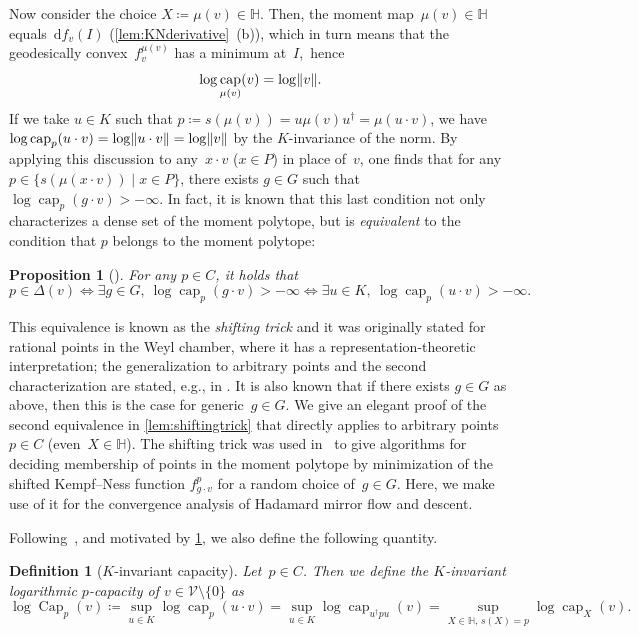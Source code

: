 \documentclass[11pt,letterpaper]{article}
\newtheorem{definition}[theorem]{Definition}\AddToHook{env/definition/begin}{\crefalias{theorem}{definition}}
\newtheorem{proposition}[theorem]{Proposition}\AddToHook{env/proposition/begin}{\crefalias{theorem}{proposition}}\crefname{proposition}{Proposition}{Propositions}
\numberwithin{equation}{section}
\newcommand{\bbH}{\mathbb{H}}
\newcommand{\diff}{\mathrm{d}}
\newcommand{\VV}{\mathcal{V}}
\DeclareMathOperator{\capacity}{cap}
\DeclareMathOperator{\Capacity}{Cap}
\DeclarePairedDelimiter\norm{\lVert}{\rVert}
\begin{document}
Now consider the choice $X \coloneqq \mu(v) \in \bbH$.
Then, the moment map~$\mu(v) \in \bbH$ equals~$\diff f_v(I)$ (\cref{lem:KNderivative}~(b)), which in turn means that the geodesically convex~$f_v^{\mu(v)}$ has a minimum at~$I$,~hence
\[ \log\capacity_{\mu(v)}(v) = \log\norm v. \]
If we take $u \in K$ such that $p \coloneqq s(\mu(v)) = u\mu(v)u^\dagger = \mu(u\cdot v)$, we have
$\log\capacity_p(u\cdot v) = \log\norm{u \cdot v} = \log\norm v$
by the $K$-invariance of the norm.
By applying this discussion to any~$x\cdot v$ ($x \in P$) in place of~$v$, one finds that for any $p \in \{s(\mu(x\cdot v)) \mid x \in P\}$, there exists $g \in G$ such that $\log\capacity_p(g\cdot v) > -\infty$.
In fact, it is known that this last condition not only characterizes a dense set of the moment polytope, but is \emph{equivalent} to the condition that $p$ belongs to the moment polytope:

\begin{proposition}[\cite{NessMumford1984,Brion-06,BFGOWW2019,FW2020}]\label{prop:shiftingtrick_orig}
    For any $p \in C$, it holds that
    \[
        p \in \Delta(v)
    \iff \exists g \in G,\ \log\capacity_p(g\cdot v) > -\infty
    \iff \exists u \in K,\ \log\capacity_p(u \cdot v) > -\infty.
    \]
\end{proposition}

This equivalence is known as the \emph{shifting trick} and it was originally stated for rational points in the Weyl chamber, where it has a representation-theoretic interpretation;
the generalization to arbitrary points and the second characterization are stated, e.g., in \cite{FW2020}.
It is also known that if there exists $g \in G$ as above, then this is the case for generic~$g \in G$.
We give an elegant proof of the second equivalence in \cref{lem:shiftingtrick} that directly applies to arbitrary points~$p \in C$ (even~$X \in \bbH$).
The shifting trick was used in~\cite{BFGOWW2019} to give algorithms for deciding membership of points in the moment polytope by minimization of the shifted Kempf--Ness function $f_{g\cdot v}^p$ for a random choice of~$g\in G$.
Here, we make use of it for the convergence analysis of Hadamard mirror flow and descent.

Following~\cite{FW2020}, and motivated by \cref{prop:shiftingtrick_orig}, we also define the following quantity.

\begin{definition}[$K$-invariant capacity]
Let~$p\in C$.
Then we define the \emph{$K$-invariant logarithmic $p$-capacity} of $v\in\VV\setminus\{0\}$ as
\[
    \log\Capacity_p(v)
\coloneqq \sup_{u \in K} \log\capacity_p(u \cdot v)
= \sup_{u \in K} \log\capacity_{u^\dagger p u}(v)
= \sup_{X \in \bbH, \, s(X)=p} \log\capacity_X(v).
\]
\end{definition}
\end{document}
